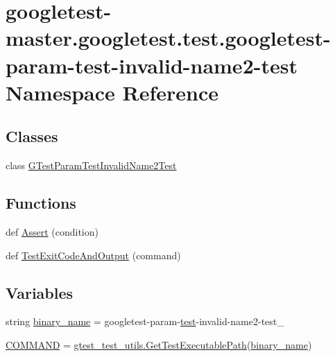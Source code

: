 \hypertarget{namespacegoogletest-master_1_1googletest_1_1test_1_1googletest-param-test-invalid-name2-test}{}\section{googletest-\/master.googletest.\+test.\+googletest-\/param-\/test-\/invalid-\/name2-\/test Namespace Reference}
\label{namespacegoogletest-master_1_1googletest_1_1test_1_1googletest-param-test-invalid-name2-test}
\subsection*{Classes}
\begin{DoxyCompactItemize}
\item 
class \mbox{\hyperlink{classgoogletest-master_1_1googletest_1_1test_1_1googletest-param-test-invalid-name2-test_1_1_g_tff88aa7127808d8f576f122583350856}{G\+Test\+Param\+Test\+Invalid\+Name2\+Test}}
\end{DoxyCompactItemize}
\subsection*{Functions}
\begin{DoxyCompactItemize}
\item 
def \mbox{\hyperlink{namespacegoogletest-master_1_1googletest_1_1test_1_1googletest-param-test-invalid-name2-test_a08dffe47cfae32a14acec6707be3b938}{Assert}} (condition)
\item 
def \mbox{\hyperlink{namespacegoogletest-master_1_1googletest_1_1test_1_1googletest-param-test-invalid-name2-test_a4afd04cd5c39aa2d0b2ff2528d204c94}{Test\+Exit\+Code\+And\+Output}} (command)
\end{DoxyCompactItemize}
\subsection*{Variables}
\begin{DoxyCompactItemize}
\item 
string \mbox{\hyperlink{namespacegoogletest-master_1_1googletest_1_1test_1_1googletest-param-test-invalid-name2-test_a4deb61f803e1e11f24a9a8b80b5eba13}{binary\+\_\+name}} = \textquotesingle{}googletest-\/param-\/\mbox{\hyperlink{_mutual_8h_a707ee03719e99670bf6cfdfd897b8456}{test}}-\/invalid-\/name2-\/test\+\_\+\textquotesingle{}
\item 
\mbox{\hyperlink{namespacegoogletest-master_1_1googletest_1_1test_1_1googletest-param-test-invalid-name2-test_a7525b00697d99622d0a6d23c192d5444}{C\+O\+M\+M\+A\+ND}} = \mbox{\hyperlink{namespacegoogletest-master_1_1googletest_1_1test_1_1gtest__test__utils_a78bbc69ac699e750a6a29188caa643c4}{gtest\+\_\+test\+\_\+utils.\+Get\+Test\+Executable\+Path}}(\mbox{\hyperlink{namespacegoogletest-master_1_1googletest_1_1test_1_1googletest-param-test-invalid-name2-test_a4deb61f803e1e11f24a9a8b80b5eba13}{binary\+\_\+name}})
\end{DoxyCompactItemize}


